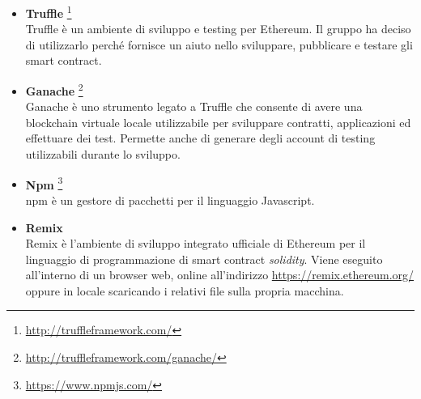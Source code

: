 \begin{itemize}
	\item \textbf{Truffle} \footnote{\href{http://truffleframework.com/}{http://truffleframework.com/}}
	~\\Truffle è un ambiente di sviluppo e testing per Ethereum. Il gruppo ha deciso di utilizzarlo perché fornisce un aiuto nello sviluppare, pubblicare e testare gli smart contract.
	\item \textbf{Ganache} \footnote{\href{http://truffleframework.com/ganache/}{http://truffleframework.com/ganache/}}
	~\\Ganache è uno strumento legato a Truffle che consente di avere una blockchain virtuale locale utilizzabile per sviluppare contratti, applicazioni ed effettuare dei test. Permette anche di generare degli account di testing  utilizzabili  durante lo sviluppo.
	\item \textbf{Npm} \footnote{\href{https://www.npmjs.com/}{https://www.npmjs.com/}}
	~\\npm è un gestore di pacchetti per il linguaggio Javascript.
	
	\item \textbf{Remix}
	~\\Remix è l'ambiente di sviluppo integrato ufficiale di Ethereum per il linguaggio di programmazione di smart contract \textit{solidity}. Viene eseguito all'interno di un browser web, online all'indirizzo  \url{https://remix.ethereum.org/} oppure in locale scaricando i relativi file sulla propria macchina.%
\end{itemize}	

